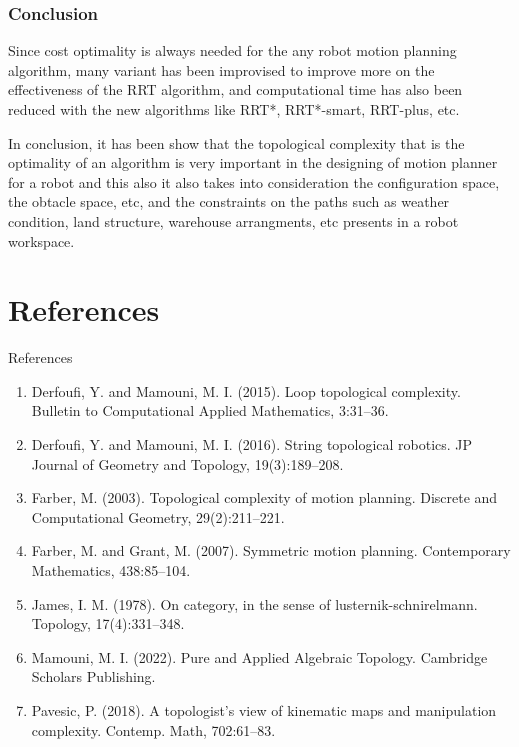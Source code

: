 \documentclass{beamer}
\begin{document}
\begin{frame}
    \frametitle{Conclusion}
    Since cost optimality is always needed for the any robot motion planning algorithm, many variant has been improvised to improve more on the effectiveness of the RRT algorithm, and computational time has also been reduced with the new algorithms like RRT*, RRT*-smart, RRT-plus, etc.

    In conclusion, it has been show that the topological complexity that is the optimality of an algorithm is very important in the designing of motion planner for a robot and this also it also takes into consideration the configuration space, the obtacle space, etc, and the constraints on the paths such as weather condition, land structure, warehouse arrangments, etc presents in a robot workspace.
\end{frame}

\section{References}
\begin{frame}{References}
    \begin{enumerate}
        \item Derfoufi, Y. and Mamouni, M. I. (2015). Loop topological complexity. Bulletin to Computational Applied Mathematics, 3:31--36.
        \item Derfoufi, Y. and Mamouni, M. I. (2016). String topological robotics. JP Journal
        of Geometry and Topology, 19(3):189--208.
        \item Farber, M. (2003). Topological complexity of motion planning. Discrete and Computational Geometry, 29(2):211--221.
        \item Farber, M. and Grant, M. (2007). Symmetric motion planning. Contemporary Mathematics, 438:85--104. 
        \item James, I. M. (1978). On category, in the sense of lusternik-schnirelmann. Topology, 17(4):331--348.
        \item Mamouni, M. I. (2022). Pure and Applied Algebraic Topology. Cambridge Scholars Publishing.
        \item Pavesic, P. (2018). A topologist's view of kinematic maps and manipulation complexity. Contemp. Math, 702:61--83.
    \end{enumerate}
\end{frame}
\end{document}
